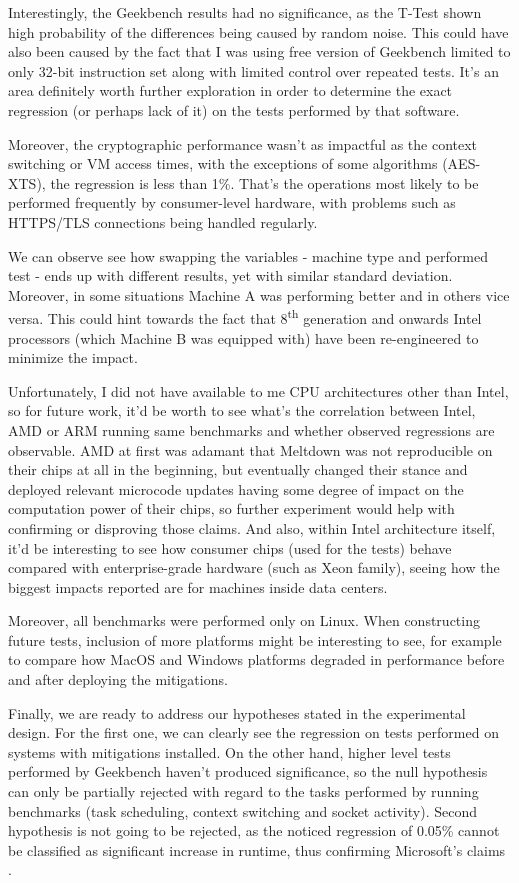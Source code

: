 \documentclass{csfourzero}
\begin{document}
Interestingly, the Geekbench results had no significance, as the T-Test shown high probability of the differences being caused by random noise. This could have also been caused by the fact that I was using free version of Geekbench limited to only 32-bit instruction set along with limited control over repeated tests. It's an area definitely worth further exploration in order to determine the exact regression (or perhaps lack of it) on the tests performed by that software.  

Moreover, the cryptographic performance wasn't as impactful as the context switching or VM access times, with the exceptions of some algorithms (AES-XTS), the regression is less than 1\%. That's the operations most likely to be performed frequently by consumer-level hardware, with problems such as HTTPS/TLS connections being handled regularly.

We can observe see how swapping the variables - machine type and performed test - ends up with different results, yet with similar standard deviation. Moreover, in some situations Machine A was performing better and in others vice versa. This could hint towards the fact that 8\textsuperscript{th} generation and onwards Intel processors (which Machine B was equipped with) have been re-engineered to minimize the impact.  

Unfortunately, I did not have available to me CPU architectures other than Intel, so for future work, it'd be worth to see what's the correlation between Intel, AMD or ARM running same benchmarks and whether observed regressions are observable. AMD at first was adamant that Meltdown was not reproducible on their chips at all in the beginning, but eventually changed their stance \cite{amdsec} and deployed relevant microcode updates having some degree of impact on the computation power of their chips, so further experiment would help with confirming or disproving those claims. And also, within Intel architecture itself, it'd be interesting to see how consumer chips (used for the tests) behave compared with enterprise-grade hardware (such as Xeon family), seeing how the biggest impacts reported are for machines inside data centers.

Moreover, all benchmarks were performed only on Linux. When constructing future tests, inclusion of more platforms might be interesting to see, for example to compare how MacOS and Windows platforms degraded in performance before and after deploying the mitigations.

Finally, we are ready to address our hypotheses stated in the experimental design. For the first one, we can clearly see the regression on tests performed on systems with mitigations installed. On the other hand, higher level tests performed by Geekbench haven't produced significance, so the null hypothesis can only be partially rejected with regard to the tasks performed by running benchmarks (task scheduling, context switching and socket activity). Second hypothesis is not going to be rejected, as the noticed regression of 0.05\% cannot be classified as significant increase in runtime, thus confirming Microsoft's claims \cite{myerson2018understanding}.
\end{document}
